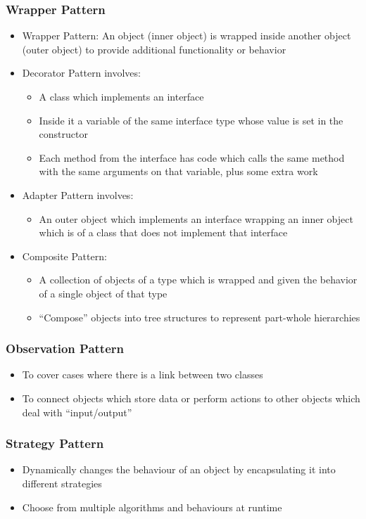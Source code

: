 \documentclass[12pt,openany]{book}
\begin{document}
\subsubsection{Wrapper Pattern}
\begin{itemize}
    \item Wrapper Pattern: An object (inner object) is wrapped inside another object (outer object) to provide additional functionality or behavior
    \item Decorator Pattern involves:
    \begin{itemize}
        \item A class which implements an interface
        \item Inside it a variable of the same interface type whose value is set in the constructor
        \item Each method from the interface has code which calls the same method with the same arguments on that variable, plus some extra work
    \end{itemize}
    \item Adapter Pattern involves:
    \begin{itemize}
        \item An outer object which implements an interface wrapping an inner object which is of a class that does not implement that interface
    \end{itemize}
    \item Composite Pattern:
    \begin{itemize}
        \item A collection of objects of a type which is wrapped and given the behavior of a single object of that type
        \item ``Compose'' objects into tree structures to represent part-whole hierarchies
    \end{itemize}
\end{itemize}
\subsubsection{Observation Pattern}
\begin{itemize}
    \item To cover cases where there is a link between two classes
    \item To connect objects which store data or perform actions to other objects which deal with ``input/output''
\end{itemize}
\subsubsection{Strategy Pattern}
\begin{itemize}
    \item Dynamically changes the behaviour of an object by encapsulating it into different strategies
    \item Choose from multiple algorithms and behaviours at runtime
\end{itemize}
\end{document}
